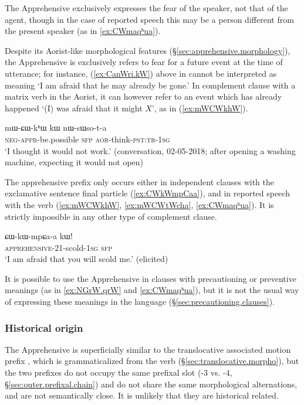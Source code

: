  The Apprehensive exclusively expresses the fear of the speaker, not that of the agent, though in the case of reported speech this may be a person different from the present speaker (as in \ref{ex:CWmaqʰua}). 
  
Despite its Aorist-like morphological features (§\ref{sec:apprehensive.morphology}), the Apprehensive is exclusively refers to fear for a future event at the time of utterance; for instance, (\ref{ex:CanWri.kW}) above in cannot be interpreted as meaning  `I am afraid that he may already be gone.'  In complement clause with a matrix verb in the Aorist, it can however refer to an event which has already happened `(I) was afraid that it might $X$', as in (\ref{ex:mWCWkhW}). 
  
\begin{exe}
\ex \label{ex:mWCWkhW}
\gll   mɯ-ɕɯ-kʰɯ kɯ nɯ-sɯso-t-a \\
\textsc{neg}-\textsc{appr}-be.possible \textsc{sfp} \textsc{aor}-think-\textsc{pst}:\textsc{tr}-\textsc{1sg} \\
\glt `I thought it would not work.'  (conversation, 02-05-2018; after opening a washing machine, expecting it would not open)
\end{exe}
 
The apprehensive prefix  only occurs either in independent clauses with the exclamative sentence final particle  (\ref{ex:CWkWmpCaa}), and in reported speech with the verb  (\ref{ex:mWCWkhW}, \ref{ex:mWCWtWcha}, \ref{ex:CWmaqʰua}). It is strictly impossible in any other type of complement clause. 

 \begin{exe}
\ex \label{ex:CWkWmpCaa}
\gll  ɕɯ-kɯ-mpɕa-a kɯ!   \\
\textsc{apprehensive}-2\fl{}1-scold-\textsc{1sg} \textsc{sfp} \\
\glt  `I am afraid that you will scold me.' (elicited)
  \end{exe}

 It is possible to use the Apprehensive in clauses with precautioning or preventive meanings (as in \ref{ex:NGrW.qrW} and \ref{ex:CWmaqʰua}), but it is not the usual way of expressing these meanings in the language (§\ref{sec:precautioning.clauses}).


\subsubsection{Historical origin} \label{sec:apprehensive.history}
The Apprehensive  is superficially similar to the translocative associated motion prefix , which is grammaticalized from the verb  (§\ref{sec:translocative.morpho}), but the two prefixes do not occupy the same prefixal slot (-3 vs. -4, §\ref{sec:outer.prefixal.chain}) and do not share the same morphological alternations, and are not semantically close. It is unlikely that they are historical related.

